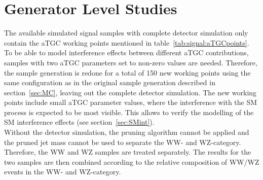 \section{Generator Level Studies}
The available simulated signal samples with complete detector simulation only contain the aTGC working points mentioned in table~\ref{tab:signal:aTGCpoints}. To be able to model interference effects between different aTGC contributions, samples with two aTGC parameters set to non-zero values are needed. Therefore, the sample generation is redone for a total of 150 new working points using the same configuration as in the original sample generation described in section~\ref{sec:MC}, leaving out the complete detector simulation. The new working points include small aTGC parameter values, where the interference with the SM process is expected to be most visible. This allows to verify the modelling of the SM interference effects (see section~\ref{sec:SMint}).\\

\noindent Without the detector simulation, the pruning algorithm cannot be applied and the pruned jet mass cannot be used to separate the WW- and WZ-category. Therefore, the WW and WZ samples are treated separately. The results for the two samples are then combined according to the relative composition of WW/WZ events in the WW- and WZ-category.  

